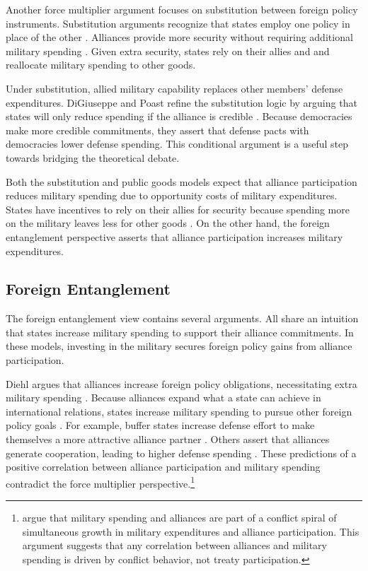 \documentclass[12pt]{article}
\begin{document}
Another force multiplier argument focuses on substitution between foreign policy instruments.
Substitution arguments recognize that states employ one policy in place of the other \citep{MostStarr1989}.
Alliances provide more security without requiring additional military spending \citep{Morrow1993, Conybeare1994}. 
Given extra security, states rely on their allies and and reallocate military spending to other goods. 


Under substitution, allied military capability replaces other members' defense expenditures. 
DiGiuseppe and Poast refine the substitution logic by arguing that states will only reduce spending if the alliance is credible \citep{DigiuseppePoast2016}.
Because democracies make more credible commitments, they assert that defense pacts with democracies lower defense spending.
This conditional argument is a useful step towards bridging the theoretical debate. 


Both the substitution and public goods models expect that alliance participation reduces military spending due to opportunity costs of military expenditures. 
States have incentives to rely on their allies for security because spending more on the military leaves less for other goods \citep{Fordham1998, Fearon2018}.
On the other hand, the foreign entanglement perspective asserts that alliance participation increases military expenditures. 


\subsection{Foreign Entanglement}


The foreign entanglement view contains several arguments.
All share an intuition that states increase military spending to support their alliance commitments. 
In these models, investing in the military secures foreign policy gains from alliance participation. 


Diehl argues that alliances increase foreign policy obligations, necessitating extra military spending \citep{Diehl1994}.
Because alliances expand what a state can achieve in international relations, states increase military spending to pursue other foreign policy goals \cite{MorganPalmer2006}.
For example, buffer states increase defense effort to make themselves a more attractive alliance partner \citep{Horowitzetal2017}.
Others assert that alliances generate cooperation, leading to higher defense spending \citep{Palmer1990, QuirozFlores2011}. 
These predictions of a positive correlation between alliance participation and military spending contradict the force multiplier perspective.\footnote{
\citet{SeneseVasquez2008} argue that military spending and alliances are part of a conflict spiral of simultaneous growth in military expenditures and alliance participation. 
This argument suggests that any correlation between alliances and military spending is driven by conflict behavior, not treaty participation.
}
\end{document}
